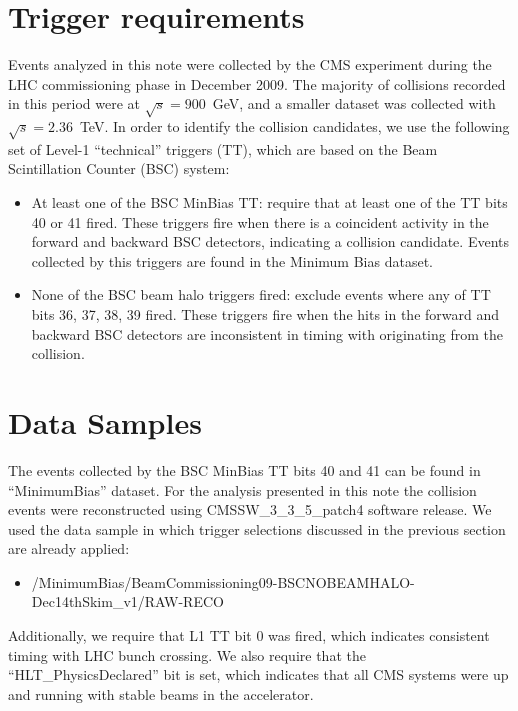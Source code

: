 \section{Trigger requirements}

Events analyzed in this note were collected by the CMS experiment during the LHC
commissioning phase in December 2009. The majority of collisions
recorded in this period were at $\sqrt{s}=900$~GeV, and a
smaller dataset was collected with $\sqrt{s}=2.36$~TeV. In order to
identify the collision candidates, we use the following
set of Level-1 ``technical'' triggers (TT), which are based on the Beam Scintillation
Counter (BSC) system:

\begin{itemize}
\item At least one of the BSC MinBias TT: require that at least one of
  the TT bits 40 or 41 fired. These triggers fire when there is a
  coincident activity in the forward and backward BSC detectors,
  indicating a collision candidate. Events collected by this triggers are found in the Minimum Bias dataset.

\item None of the BSC beam halo triggers fired: exclude events where any
  of TT bits 36, 37, 38, 39 fired. These triggers fire when the hits in
  the forward and backward BSC detectors are inconsistent in timing with
  originating from the collision.
\end{itemize}

\section{Data Samples}

The events collected by the BSC MinBias TT bits 40 and 41 can be found
in ``MinimumBias'' dataset. For the analysis presented in this note the
collision events were reconstructed using CMSSW\_3\_3\_5\_patch4
software release. We used the data sample in which trigger selections
discussed in the previous section are already applied:
\begin{itemize}
\item
  /MinimumBias/BeamCommissioning09-BSCNOBEAMHALO-Dec14thSkim\_v1/RAW-RECO
\end{itemize}
Additionally, we require that L1 TT bit 0 was fired, which
indicates consistent timing with LHC bunch crossing. We also require
that the ``HLT\_PhysicsDeclared'' bit is set, which indicates that all
CMS systems were up and running with stable beams in the
accelerator. 

